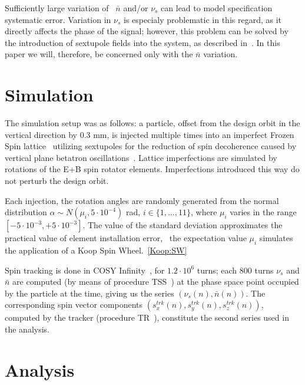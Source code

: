 \documentclass[a4paper]{jacow}
\newcommand{\nbar}{\bar n}
\begin{document}
Sufficiently large variation of~ $\nbar$ and/or $\nu_s$ can lead to model specification systematic error.
Variation in $\nu_s$ is especialy problematic in this regard, as it directly affects the phase of the signal;
however, this problem can be solved by the introduction of sextupole fields into the system,
as described in~\cite{Aksentev:DecohIPAC19}. In this paper we will, therefore, be concerned only with the $\nbar$
variation.

\section{Simulation}
The simulation setup was as follows: a particle, offset from the design orbit in the vertical
direction by 0.3 mm, is injected multiple times into an imperfect
Frozen Spin lattice~\cite{Senichev:Lattices} utilizing sextupoles for
the reduction of spin decoherence caused by vertical plane betatron
oscillations~\cite{Aksentev:DecohIPAC19}.
Lattice imperfections are simulated by rotations of the E+B spin
rotator elements. Imperfections introduced this way do not perturb the design orbit.

Each injection, the rotation angles are randomly generated from the
normal distribution $\alpha\sim N(\mu_i, 5\cdot 10^{-4})$ rad, $i\in\{1,\dots,11\}$, where
$\mu_i$ varies in the range $[-5\cdot10^{-3}, +5\cdot10^{-3}]$. The value of the standard deviation approximates
the practical value of element installation error,~\cite{Senichev:FDM} the expectation value $\mu_i$ simulates the
application of a Koop Spin Wheel.~\ref{Koop:SW} 

Spin tracking is done in COSY Infinity~\cite{COSYINF:Website}, for $1.2\cdot10^6$ turns; each 800 turns
$\nu_s$ and $\nbar$ are computed (by means of procedure TSS~\cite[p.~41]{COSYINF:BeamPhysMan}) at
the phase space point occupied by the particle at the time, giving us the series $(\nu_s(n), \nbar(n))$.
The corresponding spin vector components $(s_x^{trk}(n), s_y^{trk}(n), s_z^{trk}(n))$,
computed by the tracker (procedure
TR~\cite[p.~41]{COSYINF:BeamPhysMan}), 
constitute the second series used in the analysis.

\section{Analysis}
\end{document}
